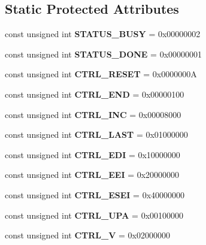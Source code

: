 \subsection*{Static Protected Attributes}
\begin{CompactItemize}
\item 
\hypertarget{classmprace_1_1DMAEngineWG_t0}{
const unsigned int {\bf STATUS\_\-BUSY} = 0x00000002}
\label{classmprace_1_1DMAEngineWG_t0}

\item 
\hypertarget{classmprace_1_1DMAEngineWG_t1}{
const unsigned int {\bf STATUS\_\-DONE} = 0x00000001}
\label{classmprace_1_1DMAEngineWG_t1}

\item 
\hypertarget{classmprace_1_1DMAEngineWG_t2}{
const unsigned int {\bf CTRL\_\-RESET} = 0x0000000A}
\label{classmprace_1_1DMAEngineWG_t2}

\item 
\hypertarget{classmprace_1_1DMAEngineWG_t3}{
const unsigned int {\bf CTRL\_\-END} = 0x00000100}
\label{classmprace_1_1DMAEngineWG_t3}

\item 
\hypertarget{classmprace_1_1DMAEngineWG_t4}{
const unsigned int {\bf CTRL\_\-INC} = 0x00008000}
\label{classmprace_1_1DMAEngineWG_t4}

\item 
\hypertarget{classmprace_1_1DMAEngineWG_t5}{
const unsigned int {\bf CTRL\_\-LAST} = 0x01000000}
\label{classmprace_1_1DMAEngineWG_t5}

\item 
\hypertarget{classmprace_1_1DMAEngineWG_t6}{
const unsigned int {\bf CTRL\_\-EDI} = 0x10000000}
\label{classmprace_1_1DMAEngineWG_t6}

\item 
\hypertarget{classmprace_1_1DMAEngineWG_t7}{
const unsigned int {\bf CTRL\_\-EEI} = 0x20000000}
\label{classmprace_1_1DMAEngineWG_t7}

\item 
\hypertarget{classmprace_1_1DMAEngineWG_t8}{
const unsigned int {\bf CTRL\_\-ESEI} = 0x40000000}
\label{classmprace_1_1DMAEngineWG_t8}

\item 
\hypertarget{classmprace_1_1DMAEngineWG_t9}{
const unsigned int {\bf CTRL\_\-UPA} = 0x00100000}
\label{classmprace_1_1DMAEngineWG_t9}

\item 
\hypertarget{classmprace_1_1DMAEngineWG_t10}{
const unsigned int {\bf CTRL\_\-V} = 0x02000000}
\label{classmprace_1_1DMAEngineWG_t10}


\end{CompactItemize}

